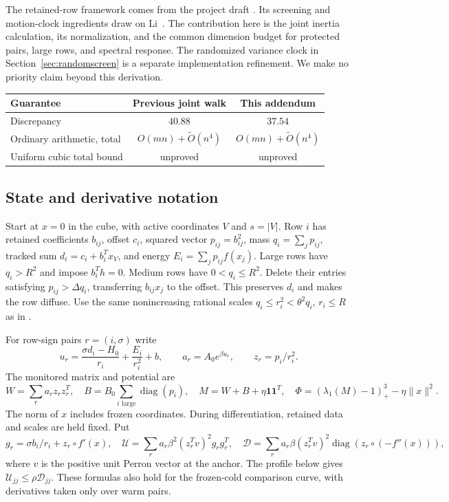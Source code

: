 \documentclass[11pt]{amsart}
\theoremstyle{remark}\newtheorem{remark}[theorem]{Remark}
\newcommand{\one}{\mathbf1}
\newcommand{\diag}{\operatorname{diag}}
\begin{document}
The retained-row framework comes from the project draft
\cite{project}. Its screening and motion-clock ingredients draw on
Li~\cite{Li}. The contribution here is the joint inertia calculation, its normalization,
and the common dimension budget for protected pairs, large rows, and
spectral response. The randomized variance clock in
Section~\ref{sec:randomscreen} is a separate implementation refinement.
We make no priority claim beyond this derivation.

\begin{center}
\begin{tabular}{lcc}
\toprule
Guarantee & Previous joint walk & This addendum\\
\midrule
Discrepancy & $40.88$ & $37.54$\\
Ordinary arithmetic, total & $O(mn)+\widetilde O(n^4)$
 & $O(mn)+\widetilde O(n^4)$\\
Uniform cubic total bound & unproved & unproved\\
\bottomrule
\end{tabular}
\end{center}

\subsection{State and derivative notation}
Start at $x=0$ in the cube, with active coordinates $V$ and $s=|V|$.
Row $i$ has retained coefficients $b_{ij}$, offset $c_i$, squared vector
$p_{ij}=b_{ij}^2$, mass $q_i=\sum_jp_{ij}$, tracked sum
$d_i=c_i+b_i^Tx_V$, and energy $E_i=\sum_jp_{ij}f(x_j)$.
Large rows have $q_i>R^2$ and impose $b_i^Th=0$.
Medium rows have $0<q_i\le R^2$. Delete their entries satisfying
$p_{ij}>\Delta q_i$, transferring $b_{ij}x_j$ to the offset.
This preserves $d_i$ and makes the row diffuse. Use the same nonincreasing
rational scales $q_i\le r_i^2<\theta^2q_i$, $r_i\le R$ as in
\cite{baseline}.

For row-sign pairs $r=(i,\sigma)$ write
\[
 u_r=\frac{\sigma d_i-H_0}{r_i}+\frac{E_i}{r_i^2}+b,
 \qquad a_r=A_0e^{\beta u_r},\qquad z_r=p_i/r_i^2.
\]
The monitored matrix and potential are
\[
 W=\sum_r a_rz_rz_r^T,\quad
 B=B_0\sum_{i\text{ large}}\diag(p_i),\quad
 M=W+B+\eta\one\one^T,\quad
 \Phi=(\lambda_1(M)-1)_+^3-\eta\|x\|^2.
\]
The norm of $x$ includes frozen coordinates. During differentiation,
retained data and scales are held fixed. Put
\[
 g_r=\sigma b_i/r_i+z_r\circ f'(x),\quad
 \mathcal U=\sum_r a_r\beta^2(z_r^Tv)^2g_rg_r^T,\quad
 \mathcal D=\sum_r a_r\beta(z_r^Tv)^2
                      \diag(z_r\circ(-f''(x))),
\]
where $v$ is the positive unit Perron vector at the anchor.
The profile below gives $\mathcal U_{jj}\le\rho\mathcal D_{jj}$.
These formulas also hold for the frozen-cold comparison curve, with
derivatives taken only over warm pairs.
\end{document}
